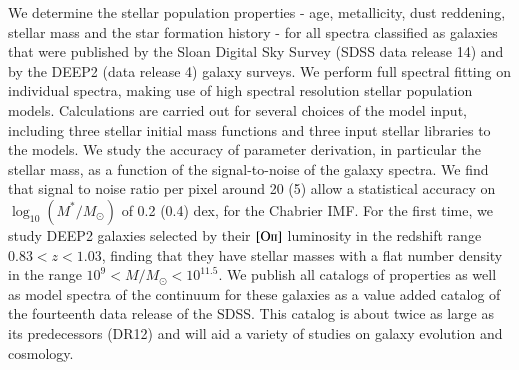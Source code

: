 \documentclass[onecolumn]{aa}
\newcommand{\OII}{$\left[\mathrm{O\textrm{\textsc{ii}}}\right]$\xspace}
\begin{document}
\abstract
{}
{We determine the stellar population properties - age, metallicity, dust reddening, stellar mass and the star formation history - for all spectra classified as galaxies that were published by the Sloan Digital Sky Survey (SDSS data release 14) and by the DEEP2 (data release 4) galaxy surveys.}
{We perform full spectral fitting on individual spectra, making use of high spectral resolution stellar population models. Calculations are carried out for several choices of the model input, including three stellar initial mass functions and three input stellar libraries to the models. We study the accuracy of parameter derivation, in particular the stellar mass, as a function of the signal-to-noise of the galaxy spectra. We find that signal to noise ratio per pixel around 20 (5) allow a statistical accuracy on $\log_{10}(M^{*}/M_{\odot})$ of 0.2 (0.4) dex, for the Chabrier IMF.}
{%
For the first time, we study DEEP2 galaxies selected by their \OII luminosity in the redshift range $0.83<z<1.03$, finding that they have stellar masses with a flat number density in the range $10^9<M/M_{\odot}<10^{11.5}$. 
We publish all catalogs of properties as well as model spectra of the continuum for these galaxies as a value added catalog of the fourteenth data release of the SDSS. This catalog is about twice as large as its predecessors (DR12) and will aid a variety of studies on galaxy evolution and cosmology.}
{}

\maketitle

\clearpage
\tableofcontents
\clearpage
\end{document}
